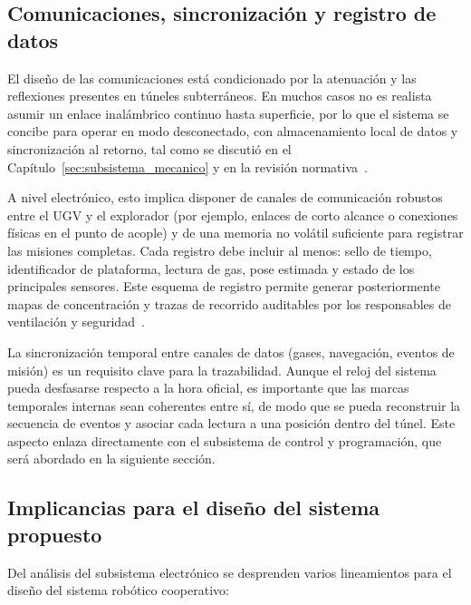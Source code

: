 \subsection{Comunicaciones, sincronización y registro de datos}

\hspace{1.25cm}
El diseño de las comunicaciones está condicionado por la atenuación y las reflexiones presentes en túneles subterráneos. En muchos casos no es realista asumir un enlace inalámbrico continuo hasta superficie, por lo que el sistema se concibe para operar en modo desconectado, con almacenamiento local de datos y sincronización al retorno, tal como se discutió en el Capítulo~\ref{sec:subsistema_mecanico} y en la revisión normativa~\cite{OSINERGMIN_BoletinGSM_2020,MINEM_DS024_2016}.

A nivel electrónico, esto implica disponer de canales de comunicación robustos entre el UGV y el explorador (por ejemplo, enlaces de corto alcance o conexiones físicas en el punto de acople) y de una memoria no volátil suficiente para registrar las misiones completas. Cada registro debe incluir al menos: sello de tiempo, identificador de plataforma, lectura de gas, pose estimada y estado de los principales sensores. Este esquema de registro permite generar posteriormente mapas de concentración y trazas de recorrido auditables por los responsables de ventilación y seguridad~\cite{OSINERGMIN_BoletinGSM_2020b,EU_ExposureDirective_2020}.

La sincronización temporal entre canales de datos (gases, navegación, eventos de misión) es un requisito clave para la trazabilidad. Aunque el reloj del sistema pueda desfasarse respecto a la hora oficial, es importante que las marcas temporales internas sean coherentes entre sí, de modo que se pueda reconstruir la secuencia de eventos y asociar cada lectura a una posición dentro del túnel. Este aspecto enlaza directamente con el subsistema de control y programación, que será abordado en la siguiente sección.

\subsection{Implicancias para el diseño del sistema propuesto}

\hspace{1.25cm}
Del análisis del subsistema electrónico se desprenden varios lineamientos para el diseño del sistema robótico cooperativo:

